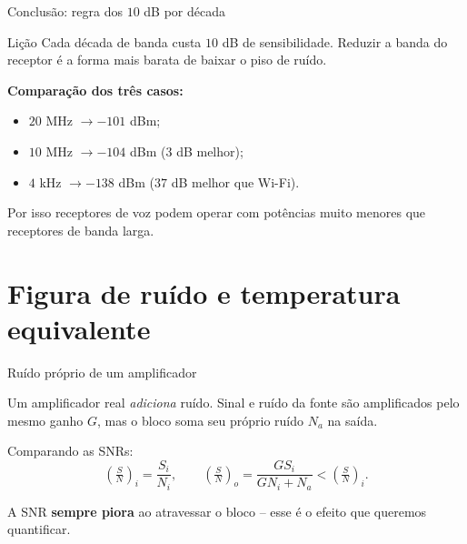 \begin{frame}{Conclusão: regra dos $10$ dB por década}

\begin{block}{Lição}
Cada década de banda custa $10$ dB de sensibilidade. Reduzir a banda do receptor é a forma mais barata de baixar o piso de ruído.
\end{block}

\vspace{0.3cm}

\textbf{Comparação dos três casos:}
\begin{itemize}
\item $20$ MHz $\to -101$ dBm;
\item $10$ MHz $\to -104$ dBm ($3$ dB melhor);
\item $4$ kHz $\to -138$ dBm ($37$ dB melhor que Wi-Fi).
\end{itemize}

Por isso receptores de voz podem operar com potências muito menores que receptores de banda larga.

\end{frame}


\section{Figura de ruído e temperatura equivalente}

\begin{frame}{Ruído próprio de um amplificador}

Um amplificador real \emph{adiciona} ruído. Sinal e ruído da fonte são amplificados pelo mesmo ganho $G$, mas o bloco soma seu próprio ruído $N_a$ na saída.

\begin{center}
\end{center}

Comparando as SNRs:
\[
\left(\tfrac{S}{N}\right)_i = \frac{S_i}{N_i},
\qquad
\left(\tfrac{S}{N}\right)_o = \frac{G S_i}{G N_i + N_a} < \left(\tfrac{S}{N}\right)_i.
\]

A SNR \textbf{sempre piora} ao atravessar o bloco -- esse é o efeito que queremos quantificar.

\end{frame}


